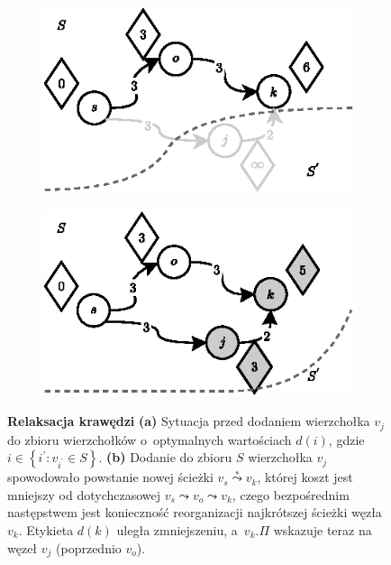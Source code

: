 \begin{figure}[!htbp]
	\centering
	\begin{subfigure}[b]{0.45\textwidth}
		\includegraphics[width=\textwidth]{Chapter_I/9/1_9a.eps}
		\caption{}
		\label{fig:relaxEdges:a}
	\end{subfigure}%
	\qquad
	\begin{subfigure}[b]{0.45\textwidth}
		\includegraphics[width=\textwidth]{Chapter_I/9/1_9b.eps}
		\caption{}
		\label{fig:relaxEdges:b}
	\end{subfigure}
	\caption{\textbf{Relaksacja krawędzi} \textbf{(a)} Sytuacja przed dodaniem wierzchołka $v_{j}$ do zbioru wierzchołków o~optymalnych wartościach $d \left( i \right) $, gdzie $i \in \left\{ i^{'} : v_{i^{'}} \in S \right\} $. \textbf{(b)} Dodanie do zbioru $S$ wierzchołka $v_{j}$ spowodowało powstanie nowej ścieżki $v_{s} \overset{*}\leadsto v_{k}$, której koszt jest mniejszy od dotychczasowej $v_{s} \leadsto v_{o} \leadsto v_{k}$, czego bezpośrednim następstwem jest konieczność reorganizacji najkrótszej ścieżki węzła $v_{k}$. Etykieta $ d \left( k \right)$ uległa zmniejszeniu, a~$v_{k}.\Pi$ wskazuje teraz na węzeł $v_{j}$ (poprzednio $v_{o}$).}\label{fig:relaxEdges}
\end{figure}

